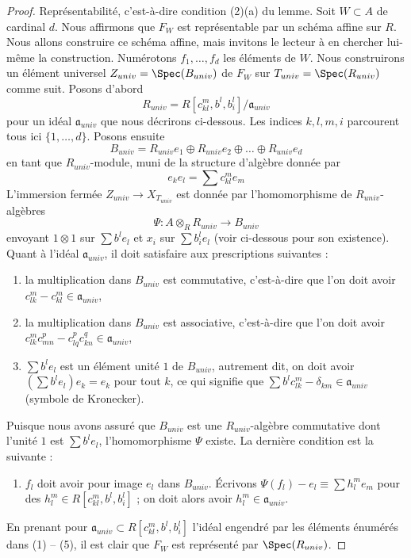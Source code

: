 \begin{proof}
\medskip\noindent
Représentabilité, c'est-à-dire condition (2)(a) du lemme. Soit $W \subset A$
de cardinal $d$. Nous affirmons que $F_W$ est représentable par un schéma
affine sur $R$. Nous allons construire ce schéma affine, mais invitons
le lecteur à en chercher lui-même la construction. Numérotons
$f_1, \ldots, f_d$ les éléments de $W$. Nous construirons un élément
universel $Z_{univ} = \Spec(B_{univ})$ de $F_W$ sur $T_{univ} = \Spec(R_{univ})$
comme suit. Posons d'abord
$$
R_{univ} = R[c_{kl}^m, b^l, b_i^l]/\mathfrak a_{univ}
$$
pour un idéal $\mathfrak a_{univ}$ que nous décrirons ci-dessous.
Les indices $k, l, m, i$ parcourent tous ici $\{1, \ldots, d\}$.
Posons ensuite
$$
B_{univ} = R_{univ}e_1 \oplus R_{univ}e_2 \oplus \ldots \oplus R_{univ}e_d
$$
en tant que $R_{univ}$-module, muni de la structure d'algèbre donnée par
$$
e_ke_l = \sum c_{kl}^m e_m
$$
L'immersion fermée $Z_{univ} \to X_{T_{univ}}$ est donnée
par l'homomorphisme de $R_{univ}$-algèbres
$$
\Psi : A \otimes_R R_{univ} \longrightarrow B_{univ}
$$
envoyant $1 \otimes 1$ sur $\sum b^le_l$ et $x_i$ sur $\sum b_i^le_l$
(voir ci-dessous pour son existence). Quant à l'idéal $\mathfrak a_{univ}$,
il doit satisfaire aux prescriptions suivantes :
\begin{enumerate}
\item la multiplication dans $B_{univ}$ est commutative, c'est-à-dire que
l'on doit avoir $c_{lk}^m - c_{kl}^m \in \mathfrak a_{univ}$,
\item la multiplication dans $B_{univ}$ est associative, c'est-à-dire que
l'on doit avoir $c_{lk}^m c_{m n}^p - c_{lq}^p c_{kn}^q \in \mathfrak a_{univ}$,
\item $\sum b^le_l$ est un élément unité $1$ de $B_{univ}$,\linebreak
autrement dit, on doit avoir $(\sum b^le_l)e_k = e_k$ pour tout $k$,
ce qui signifie que $\sum b^lc_{lk}^m - \delta_{km} \in \mathfrak a_{univ}$
(symbole de Kronecker).
\end{enumerate}
Puisque nous avons assuré que $B_{univ}$ est une
$R_{univ}$-algèbre commutative dont l'unité $1$ est $\sum b^le_l$, l'homomorphisme $\Psi$
existe. La dernière condition est la suivante :
\begin{enumerate}
\item[(5)] $f_l$ doit avoir pour image $e_l$ dans $B_{univ}$. Écrivons
$\Psi(f_l) - e_l \equiv \sum h_l^me_m$ pour des
$h_l^m \in R[c_{kl}^m, b^l, b_i^l]$ ;
on doit alors avoir $h_l^m \in \mathfrak a_{univ}$.
\end{enumerate}
En prenant pour $\mathfrak a_{univ} \subset R[c_{kl}^m, b^l, b_i^l]$ l'idéal engendré
par les éléments énumérés dans (1) -- (5),
il est clair que $F_W$ est représenté par $\Spec(R_{univ})$.
\end{proof}

